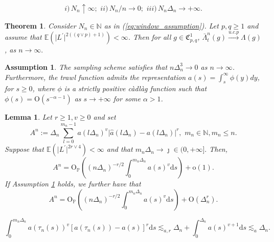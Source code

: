 \documentclass[10pt,a4paper]{amsart}
\newtheorem{theorem}{Theorem}
\newtheorem{assumption}{Assumption}
\newtheorem{lemma}{Lemma}
\begin{document}
		\begin{equation}	i)\,N_{n}\uparrow\infty;\,\,ii)\,N_{n}/n\rightarrow0;\,\,iii)\,N_{n}\Delta_{n}\rightarrow+\infty.\label{eq:window_assumption}
		\end{equation}  

		\begin{theorem}\label{consitency_Lambdan_bar}Consider $N_{n}\in\mathbb{N}$
			as in (\ref{eq:window_assumption}). Let $p,q\geq1$ and assume
			that $\mathbb{E}(\rvert L^{\prime}\rvert^{2((q\lor p)+1)})<\infty$.
			Then for all $g\in\mathfrak{C}_{p,q}^{1}$, $	\bar{\Lambda}_{t}^{n}(g)\overset{u.c.p}{\rightarrow}\Lambda(g)$, as $n\rightarrow\infty.$
		\end{theorem}

		\begin{assumption}\label{as:trawl} The sampling scheme satisfies
			that $n\Delta_{n}^{3}\rightarrow0$ as $n\rightarrow\infty$. Furthermore,
			the trawl function admits the representation $a(s)=\int_{s}^{\infty}\phi(y)dy$,
			for $s\geq0$, where $\phi$ is a strictly positive c\`adl\`ag  function such that $\phi(s)=\mathrm{O}(s^{-\alpha-1})$ as $s\rightarrow+\infty$
			for some $\alpha>1$.
			
		\end{assumption} 

		\begin{lemma}\label{lemma_error_term.} Let $r\geq1,v\geq0$ and
			set 
			\[
			A^{n}:=\Delta_{n}\sum_{l=0}^{m_{n}-1}a(l\Delta_{n})^{v}\rvert\hat{a}(l\Delta_{n})-a(l\Delta_{n})\rvert^{r},\,\,m_{n}\in\mathbb{N},m_{n}\leq n.
			\]
			Suppose that $\mathbb{E}(\rvert L^{\prime}\rvert^{2r\lor4})<\infty$
			and that $m_{n}\Delta_n\rightarrow\jmath\in(0,+\infty].$ Then, 
			\begin{equation}
				A^{n}=\mathrm{O}_{\mathbb{P}}((n\Delta_{n})^{-r/2}\int_{0}^{m_{n}\Delta_{n}}a(s)^{v}\mathrm{d}s)+\mathrm{o}(1).\label{eq:error_term_taylo1}
			\end{equation}
			If Assumption \ref{as:trawl} holds, we further have that 
			\begin{equation}
				A^{n}=\mathrm{O}_{\mathbb{P}}((n\Delta_{n})^{-r/2}\int_{0}^{m_{n}\Delta_{n}}a(s)^{v}\mathrm{d}s)+\mathrm{O}(\Delta_{n}^{r}).\label{eq:eq:error_term_taylo1}
			\end{equation}
			
			
		\end{lemma}

			\begin{equation}
				\int_{0}^{m_{n}\Delta_{n}}a(\tau_{n}(s))^{v}[a(\tau_{n}(s))-a(s)]^{r}\mathrm{d}s\lesssim_{a,r} \Delta_{n}+\int_{0}^{\Delta_{n}}a(s)^{v+1}\mathrm{d}s \lesssim_{a} \Delta_{n}.
				\label{eq:error_last_sum}
			\end{equation}
\end{document}
